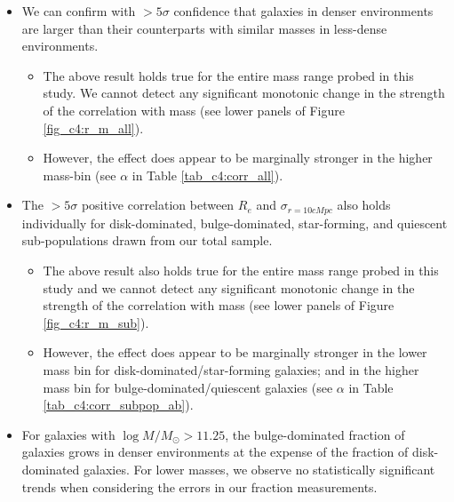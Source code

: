 \begin{itemize}
    \item We can confirm with $>5 \sigma$ confidence that galaxies in denser environments are larger than their counterparts with similar masses in less-dense environments. 
    \begin{itemize}
        \item The above result holds true for the entire mass range probed in this study. We cannot detect any significant monotonic change in the strength of the correlation with mass (see lower panels of Figure \ref{fig_c4:r_m_all}). 
        \item However, the effect does appear to be marginally stronger in the higher mass-bin (see $\alpha$ in Table \ref{tab_c4:corr_all}).
    \end{itemize}
    \item The $> 5\sigma$ positive correlation between $R_e$ and $\sigma_{r=10cMpc}$ also holds individually for disk-dominated, bulge-dominated, star-forming, and quiescent sub-populations drawn from our total sample. 
    \begin{itemize}
        \item The above result also holds true for the entire mass range probed in this study and we cannot detect any significant monotonic change in the strength of the correlation with mass (see lower panels of Figure \ref{fig_c4:r_m_sub}).
        \item However, the effect does appear to be marginally stronger in the lower mass bin for disk-dominated/star-forming galaxies; and in the higher mass bin for bulge-dominated/quiescent galaxies (see $\alpha$ in Table \ref{tab_c4:corr_subpop_ab}).
    \end{itemize}  
    \item For galaxies with $\log M/M_\odot > 11.25$, the bulge-dominated fraction of galaxies grows in denser environments at the expense of the fraction of disk-dominated galaxies. For lower masses, we observe no statistically significant trends when considering the errors in our fraction measurements.
\end{itemize}

